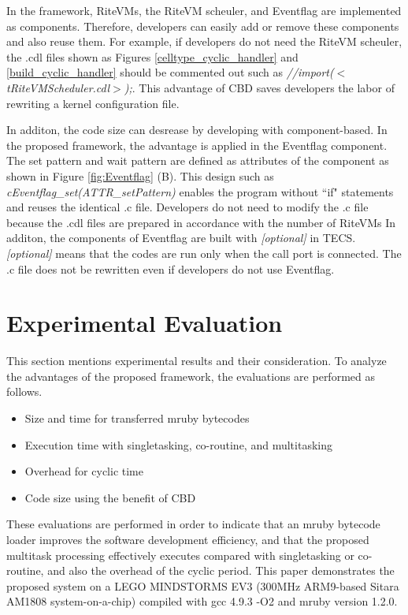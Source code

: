 \documentclass[a4j,12pt,oneside,openany,english]{jsbook}
\begin{document}
In the framework, RiteVMs, the RiteVM scheuler, and Eventflag are implemented as components.
Therefore, developers can easily add or remove these components and also reuse them.
For example, if developers do not need the RiteVM scheuler, the .cdl files shown as Figures \ref{celltype_cyclic_handler} and \ref{build_cyclic_handler} should be commented out such as {\it //import($<$tRiteVMScheduler.cdl$>$);}.
This advantage of CBD saves developers the labor of rewriting a kernel configuration file.

In additon, the code size can desrease by developing with component-based. 
In the proposed framework, the advantage is applied in the Eventflag component.
The set pattern and wait pattern are defined as attributes of the component as shown in Figure \ref{fig:Eventflag} (B).
This design such as {\it cEventflag\_set(ATTR\_setPattern)} enables the program without ``if" statements and reuses the identical .c file.
Developers do not need to modify the .c file because the .cdl files are prepared in accordance with the number of RiteVMs
In additon, the components of Eventflag are built with {\it [optional]} in TECS.
{\it [optional]} means that the codes are run only when the call port is connected.
The .c file does not be rewritten even if developers do not use Eventflag. 

\chapter{Experimental Evaluation}
\label{sec:Evaluation}
This section mentions experimental results and their consideration.
To analyze the advantages of the proposed framework, the evaluations are performed as follows.
\begin{itemize}
    \item Size and time for transferred mruby bytecodes
    \item Execution time with singletasking, co-routine, and multitasking
    \item Overhead for cyclic time
    \item Code size using the benefit of CBD 
\end{itemize}

These evaluations are performed in order to indicate that an mruby bytecode loader improves the software development efficiency, and that the proposed multitask processing effectively executes compared with singletasking or co-routine, and also the overhead of the cyclic period.
This paper demonstrates the proposed system on a LEGO MINDSTORMS EV3 (300MHz ARM9-based Sitara AM1808 system-on-a-chip) compiled with gcc 4.9.3 -O2 and mruby version 1.2.0.
\end{document}
